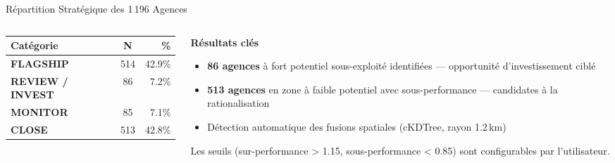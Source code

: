 \documentclass[aspectratio=169, 9pt]{beamer}
\begin{document}
\begin{frame}{Répartition Stratégique des 1\,196 Agences}
  \vspace{0.2cm}
  \begin{columns}[T]
    \begin{column}{0.45\textwidth}
      {\small
      \renewcommand{\arraystretch}{1.3}
      \begin{tabular}{@{}l c r@{}}
        \toprule
        \color{TextWhite}\textbf{Catégorie} & \color{TextWhite}\textbf{N} & \color{TextWhite}\textbf{\%} \\
        \midrule
        {\color{AccentGreen}\textbf{FLAGSHIP}} & 514 & 42.9\% \\
        {\color{AccentOrange}\textbf{REVIEW / INVEST}} & 86 & 7.2\% \\
        {\color{AccentBlue}\textbf{MONITOR}} & 85 & 7.1\% \\
        {\color{AccentRed}\textbf{CLOSE}} & 513 & 42.8\% \\
        \bottomrule
      \end{tabular}
      }
    \end{column}
    \begin{column}{0.52\textwidth}
      {\color{AccentOrange}\faExclamationCircle} \textbf{Résultats clés}

      \vspace{0.2cm}
      \begin{itemize}
        \item \textbf{86 agences} à fort potentiel sous-exploité identifiées --- opportunité d'investissement ciblé
        \item \textbf{513 agences} en zone à faible potentiel avec sous-performance --- candidates à la rationalisation
        \item Détection automatique des fusions spatiales (cKDTree, rayon 1.2\,km)
      \end{itemize}

      \vspace{0.2cm}
      {\footnotesize\color{TextMuted} Les seuils (sur-performance > 1.15, sous-performance < 0.85) sont configurables par l'utilisateur.}
    \end{column}
  \end{columns}
\end{frame}
\end{document}
